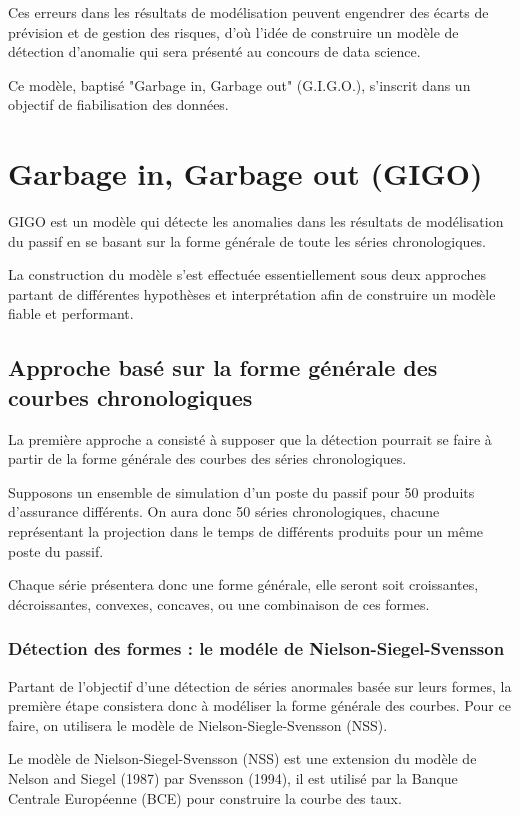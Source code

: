 Ces erreurs dans les résultats de modélisation peuvent engendrer des écarts de prévision et de gestion des risques, d'où l'idée de construire un modèle de détection d'anomalie qui sera présenté au concours de data science.

Ce modèle, baptisé "Garbage in, Garbage out" (G.I.G.O.), s'inscrit dans un objectif de fiabilisation des données.

\section{Garbage in, Garbage out (GIGO)}

GIGO est un modèle qui détecte les anomalies dans les résultats de modélisation du passif en se basant sur la forme générale de toute les séries chronologiques.

La construction du modèle s'est effectuée essentiellement sous deux approches partant de différentes hypothèses et interprétation afin de construire un modèle fiable et performant. 

\subsection{Approche basé sur la forme générale des courbes chronologiques}

La première approche a consisté à supposer que la détection pourrait se faire à partir de la forme générale des courbes des séries chronologiques. 

Supposons un ensemble de simulation d'un poste du passif pour 50 produits d'assurance différents. On aura donc 50 séries chronologiques, chacune représentant la projection dans le temps de différents produits pour un même poste du passif.

Chaque série présentera donc une forme générale, elle seront soit croissantes, décroissantes, convexes, concaves, ou une combinaison de ces formes.

\subsubsection{Détection des formes : le modéle de Nielson-Siegel-Svensson}

Partant de l'objectif d'une détection de séries anormales basée sur leurs formes, la première étape consistera donc à modéliser la forme générale des courbes. Pour ce faire, on utilisera le modèle de Nielson-Siegle-Svensson (NSS).

Le modèle de Nielson-Siegel-Svensson (NSS) est une extension du modèle de Nelson and Siegel (1987) par Svensson (1994), il est utilisé par la Banque Centrale Européenne (BCE) pour construire la courbe des taux. 

